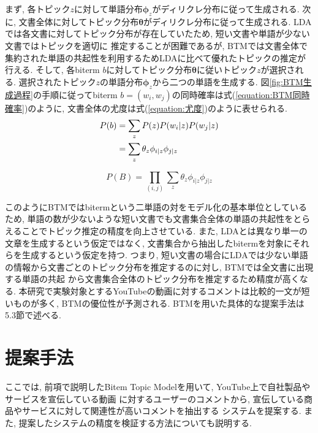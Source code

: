 \documentclass{ltjarticle}
\begin{document}
\newpage
まず, 各トピック$z$に対して単語分布$\boldsymbol{\phi}_z$がディリクレ分布に従って生成される. 
次に, 文書全体に対してトピック分布$\boldsymbol{\theta}$がディリクレ分布に従って生成される. 
LDAでは各文書に対してトピック分布が存在していたため, 短い文書や単語が少ない文書ではトピックを適切に
推定することが困難であるが, BTMでは文書全体で集約された単語の共起性を利用するためLDAに比べて優れたトピックの推定が行える.
そして, 各biterm $b$に対してトピック分布$\boldsymbol{\theta}$に従いトピック$z$が選択される. 
選択されたトピック$z$の単語分布$\boldsymbol{\phi}_z$から二つの単語を生成する. 
図\ref{fig:BTM生成過程}の手順に従ってbiterm $b = (w_i, w_j)$の同時確率は式(\ref{equation:BTM同時確率})のように, 
文書全体の尤度は式(\ref{equation:尤度})のように表せられる. \\
\begin{align}
    P(b) &= \sum_{z}P(z)P(w_i|z)P(w_j|z)\notag\\
         &= \sum_{z}\theta_z \phi_{i|z} \phi_{j|z}
    \label{equation:BTM同時確率}
\end{align}
\vspace{3truept}

\begin{equation}
    P(B) = \prod_{(i,j)}\sum_{z}\theta_z \phi_{i|z} \phi_{j|z}
    \label{equation:尤度}
\end{equation}
\vspace{5truept}

このようにBTMではbitermという二単語の対をモデル化の基本単位としているため, 
単語の数が少ないような短い文書でも文書集合全体の単語の共起性をとらえることでトピック推定の精度を向上させている. 
また, LDAとは異なり単一の文章を生成するという仮定ではなく, 文書集合から抽出したbitermを対象にそれらを生成するという仮定を持つ. 
つまり, 短い文書の場合にLDAでは少ない単語の情報から文書ごとのトピック分布を推定するのに対し, BTMでは全文書に出現する単語の共起
から文書集合全体のトピック分布を推定するため精度が高くなる. 
本研究で実験対象とするYouTubeの動画に対するコメントは比較的一文が短いものが多く, BTMの優位性が予測される. 
BTMを用いた具体的な提案手法は5.3節で述べる. 





\newpage
\section{提案手法}
ここでは, 前項で説明したBitem Topic Modelを用いて, YouTube上で自社製品やサービスを宣伝している動画
に対するユーザーのコメントから, 宣伝している商品やサービスに対して関連性が高いコメントを抽出する
システムを提案する. また, 提案したシステムの精度を検証する方法についても説明する. 
\end{document}
